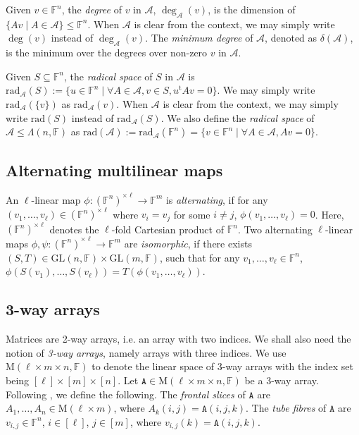 \documentclass[10pt]{article}
\newcommand{\tens}[1]{\mathtt{#1}}
\newcommand{\spa}[1]{\mathcal{#1}}
\newcommand{\GL}{\mathrm{GL}}
\newcommand{\F}{\mathbb{F}}
\newcommand{\rad}{\mathrm{rad}}
\newcommand{\M}{\mathrm{M}}
\newcommand{\cA}{\spa{A}}
\newcommand{\tA}{\tens{A}}
\newcommand{\tr}[1]{#1^{\mathrm{t}}}
\begin{document}
Given $v\in \F^n$, the \emph{degree} of $v$ in $\cA$, $\deg_\cA(v)$, is the 
dimension of $\{ Av \mid A\in \cA\}\leq \F^n$. When $\cA$ is clear from the 
context, 
we may simply write $\deg(v)$ instead of $\deg_\cA(v)$. The \emph{minimum degree} 
of $\cA$, denoted as $\delta(\cA)$, is the minimum over the degrees over non-zero 
$v$ in $\cA$. 

Given $S\subseteq \F^n$, the \emph{radical space} of $S$ in $\cA$ is 
$\rad_\cA(S):=\{u\in \F^n \mid \forall A\in \cA, v\in S, \tr{u}Av=0\}$. We may 
simply 
write $\rad_\cA(\{v\})$ as $\rad_\cA(v)$. When $\cA$ is 
clear from the context, we may simply write $\rad(S)$ instead of $\rad_\cA(S)$. We 
also define the \emph{radical space} of $\cA\leq \Lambda(n, \F)$ as
$\rad(\cA):=\rad_\cA(\F^n)=\{v\in \F^n \mid \forall A\in\cA, Av=0\}$.

\subsection{Alternating multilinear maps} An $\ell$-linear map 
$\phi:(\F^n)^{\times \ell}\to \F^m$ is \emph{alternating}, if for any $(v_1, 
\dots, 
v_\ell)\in (\F^n)^{\times \ell}$ where $v_i=v_j$ for some $i\neq j$, $\phi(v_1, 
\dots, v_\ell)=0$.
Here, $(\F^n)^{\times \ell}$ denotes 
the $\ell$-fold Cartesian product of $\F^n$. Two alternating $\ell$-linear maps 
$\phi, \psi: (\F^n)^{\times \ell}\to \F^m$ are \emph{isomorphic}, if there exists 
$(S, 
T)\in\GL(n, \F)\times\GL(m, \F)$, such that for any $v_1, \dots, v_\ell\in \F^n$, 
$\phi(S(v_1), \dots, S(v_\ell))=T(\phi(v_1, \dots, v_\ell))$. 


%
%
%


%
%
%
%
%
%
%

\subsection{3-way arrays} Matrices are 2-way arrays, i.e. an 
array with two indices. We shall also need the notion of \emph{3-way arrays}, 
namely arrays with three indices. We use $\M(\ell\times m\times 
n, \F)$ to denote the linear space of 3-way arrays with the index set being 
$[\ell]\times[m]\times [n]$. Let $\tA\in\M(\ell\times m\times n, \F)$ be a 3-way 
array. Following \cite{KB09,GQ19}, we define the following. The \emph{frontal 
slices} of $\tA$ are $A_1, 
\dots, A_n\in \M(\ell\times m)$, where $A_k(i, j)=\tA(i,j,k)$. The \emph{tube 
fibres} of $\tA$ are $v_{i,j}\in \F^n$, $i\in[\ell]$, $j\in[m]$, where 
$v_{i,j}(k)=\tA(i,j,k)$.
\end{document}
